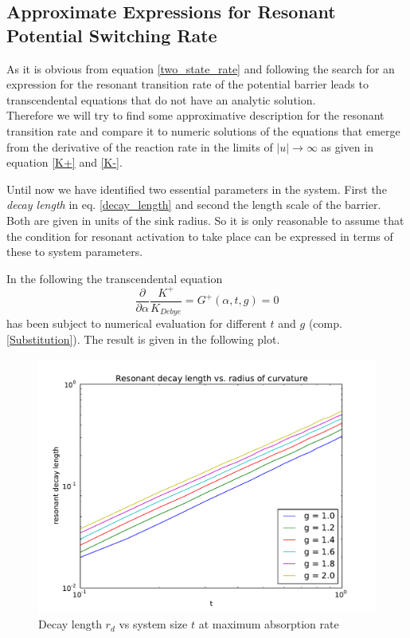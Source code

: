 \subsection{Approximate Expressions for Resonant Potential Switching Rate}
As it is obvious from equation \eqref{two_state_rate} and following the search for an expression for the resonant transition rate of the potential barrier leads to transcendental equations that do not have an analytic solution. \\
Therefore we will try to find some approximative description for the resonant transition rate and compare it to numeric solutions of the equations that emerge from the derivative of the reaction rate in the limits of $|u| \rightarrow \infty$ as given in equation \eqref{K+} and \eqref{K-}.
\par
Until now we have identified two essential parameters in the system. First the \textit{decay length} in eq. \eqref{decay_length} and second the length scale of the barrier. Both are given in units of the sink radius. So it is only reasonable to assume that the condition for resonant activation to take place can be expressed in terms of these to system parameters. 
\par
In the following the transcendental equation
\begin{equation}
    \frac{\partial}{\partial \alpha} \frac{K^{+}}{K_{Debye}} = G^{+}(\alpha, t, g) = 0
    \label{dk+=0}
\end{equation}
has been subject to numerical evaluation for different $t$ and $g$ (comp. \eqref{Substitution}). The result is given in the following plot.
\begin{figure}[H]
    \centering
    \includegraphics[width = 0.95 \textwidth]{plots/maxdclvst.pdf}
    \caption{Decay length $r_d$ vs system size $t$ at maximum absorption rate}
    \label{fig:maxdclvst}
\end{figure}

